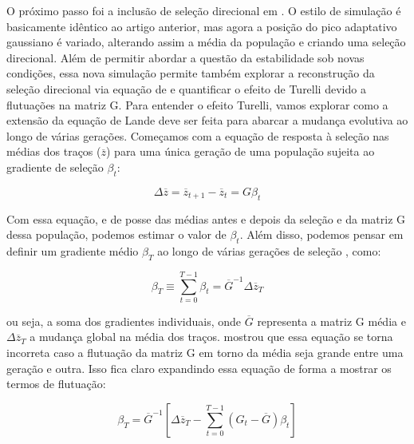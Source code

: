O próximo passo foi a inclusão de seleção direcional em \cite{Jones2004}. 
O estilo de simulação é basicamente idêntico ao artigo anterior, mas
agora a posição do pico adaptativo gaussiano é variado, alterando assim
a média da população e criando uma seleção direcional. 
Além de permitir abordar a questão da estabilidade sob novas condições,
essa nova simulação permite também explorar a reconstrução da seleção
direcional via equação de \cite{Lande1979} e quantificar o efeito de
Turelli devido a flutuações na matriz G. 
Para entender o efeito Turelli, vamos explorar como a extensão da
equação de Lande deve ser feita para abarcar a mudança evolutiva ao
longo de várias gerações. 
Começamos com a equação de resposta à seleção nas médias dos traços
($\overline {z}$) para uma única geração de uma população sujeita ao
gradiente de seleção $\beta_t$:

\begin{equation}
\Delta \overline {z} = \overline {z}_{t+1}-\overline {z}_{t}=G\beta_t
\end{equation}

Com essa equação, e de posse das médias antes e depois da seleção e da
matriz G dessa população, podemos estimar o valor de $\beta_t$. 
Além disso, podemos pensar em definir um gradiente médio $\beta_T$  ao
longo de várias gerações de seleção \citep{Lande1979}, como:

\begin{equation}
\beta_{T}\equiv \sum _{t=0}^{T-1} \beta_t =  \overline {G}^{-1}\Delta \overline {z}_T 
\end{equation}

ou seja, a soma dos gradientes individuais, onde $\overline {G}$
representa a matriz G média e $\Delta \overline {z}_T$ a mudança global
na média dos traços. 
\cite{Turelli1988} mostrou que essa equação se torna incorreta caso a
flutuação da matriz G em torno da média seja grande entre uma geração e
outra. 
Isso fica claro expandindo essa equação de forma a mostrar os termos de
flutuação:

\begin{equation}
   \beta_T = \overline {G}^{-1} \left[ \Delta \overline {z}_T - \sum_{t=0}^{T-1} (G_t - \overline {G}) \beta_t\right]
\end{equation}


